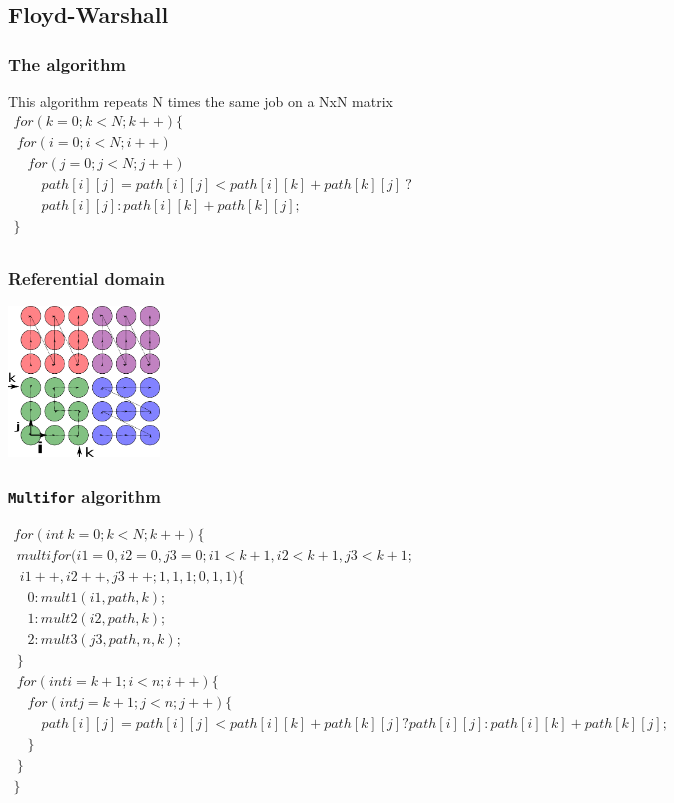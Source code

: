 \documentclass{beamer}
\begin{document}
\subsection{Floyd-Warshall}

\begin{frame}
\frametitle{The algorithm}
This algorithm repeats N times the same job on a NxN matrix\newline \\
{$\begin{array}{l}
for (k = 0; k < N; k++)\{ \\
~for(i = 0; i < N; i++) \\
\quad{}for (j = 0; j < N; j++) \\
\qquad{}path[i][j] = path[i][j] < path[i][k] + path[k][j]~? \\
\qquad{}path[i][j] : path[i][k] + path[k][j]; \\
\} \\
\end{array}$
}

\end{frame}

\begin{frame}
\frametitle{Referential domain}

\centering
\includegraphics[height=4cm]{pictures/floyd-warshall-domain}

\end{frame}


\begin{frame}
\frametitle{\texttt{Multifor} algorithm}
\scriptsize{$\begin{array}{l}
for(int~k=0; k< N; k++)\{ \\
~multifor(i1=0,i2=0,j3=0; i1<k+1, i2<k+1, j3<k+1;\\
~~i1++,i2++,j3++; 1,1,1; 0,1,1)\{ \\
\quad{}0: mult1(i1, path, k); \\
\quad{}1: mult2(i2,path,k); \\
\quad{}2: mult3(j3,path,n,k); \\
~\} \\
~for(int i=k+1; i<n;i++)\{ \\
\quad{}for(int j=k+1;j<n;j++)\{ \\
\qquad{}path[i][j] = path[i][j] < path[i][k] + path[k][j] ? path[i][j] : path[i][k] + path[k][j]; \\
\quad{}\} \\
~\} \\
\}
\end{array}$
}
\end{frame}
\end{document}
